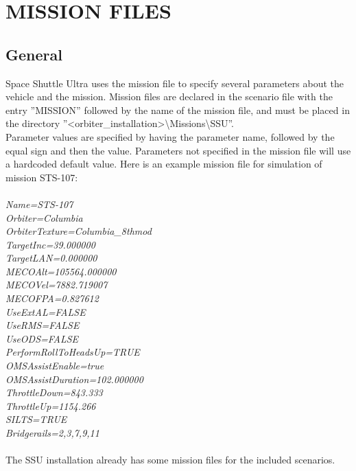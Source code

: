 \documentclass[Space_Shuttle_Ultra_Manual.tex]{subfiles}
\begin{document}
\section{MISSION FILES}
\begin{multicols*}{2}
\label{sec:mission-files}
\renewcommand{\cfttoctitlefont}{\bf}
\localtableofcontents
\end{multicols*}

\subsection{General}
\begin{multicols*}{2}
\noindent
Space Shuttle Ultra uses the mission file to specify several parameters about the vehicle and the mission. Mission files are declared in the scenario file with the entry ''MISSION'' followed by the name of the mission file, and must be placed in the directory ''<orbiter\_installation>\textbackslash Missions\textbackslash SSU''.
\\
Parameter values are specified by having the parameter name, followed by the equal sign and then the value. Parameters not specified in the mission file will use a hardcoded default value. Here is an example mission file for simulation of mission STS-107$\colon$
\\
\\
\textit{Name=STS-107}
\\
\textit{Orbiter=Columbia}
\\
\textit{OrbiterTexture=Columbia\_8thmod}
\\
\textit{TargetInc=39.000000}
\\
\textit{TargetLAN=0.000000}
\\
\textit{MECOAlt=105564.000000}
\\
\textit{MECOVel=7882.719007}
\\
\textit{MECOFPA=0.827612}
\\
\textit{UseExtAL=FALSE}
\\
\textit{UseRMS=FALSE}
\\
\textit{UseODS=FALSE}
\\
\textit{PerformRollToHeadsUp=TRUE}
\\
\textit{OMSAssistEnable=true}
\\
\textit{OMSAssistDuration=102.000000}
\\
\textit{ThrottleDown=843.333}
\\
\textit{ThrottleUp=1154.266}
\\
\textit{SILTS=TRUE}
\\
\textit{Bridgerails=2,3,7,9,11}
\\
\\
The SSU installation already has some mission files for the included scenarios.

\end{multicols*}
\end{document}
